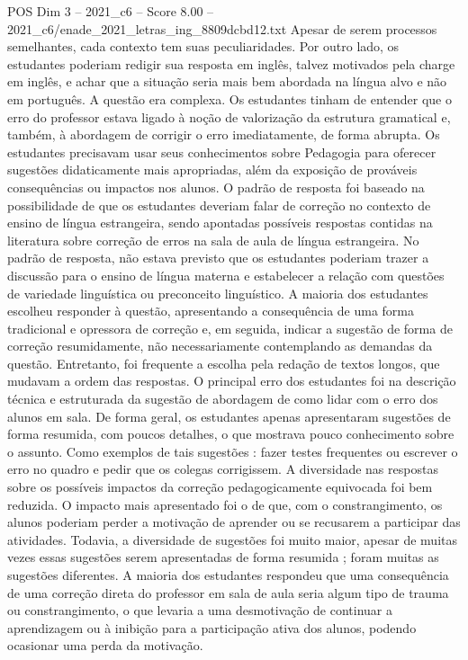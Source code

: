 \begin{textsample}{POS Dim 3 – 2021\_c6 – Score 8.00 – 2021\_c6/enade\_2021\_letras\_ing\_8809dcbd12.txt}
Apesar de serem processos semelhantes, cada contexto tem suas peculiaridades.
Por outro lado, os estudantes poderiam redigir sua resposta em inglês, talvez motivados pela charge em inglês, e achar que a situação seria mais bem abordada na língua alvo e não em português.
A questão era complexa.
Os estudantes tinham de entender que o erro do professor estava ligado à noção de valorização da estrutura gramatical e, também, à abordagem de corrigir o erro imediatamente, de forma abrupta.
Os estudantes precisavam usar seus conhecimentos sobre Pedagogia para oferecer sugestões didaticamente mais apropriadas, além da exposição de prováveis consequências ou impactos nos alunos.
O padrão de resposta foi baseado na possibilidade de que os estudantes deveriam falar de correção no contexto de ensino de língua estrangeira, sendo apontadas possíveis respostas contidas na literatura sobre correção de erros na sala de aula de língua estrangeira.
No padrão de resposta, não estava previsto que os estudantes poderiam trazer a discussão para o ensino de língua materna e estabelecer a relação com questões de variedade linguística ou preconceito linguístico.
A maioria dos estudantes escolheu responder à questão, apresentando a consequência de uma forma tradicional e opressora de correção e, em seguida, indicar a sugestão de forma de correção resumidamente, não necessariamente contemplando as demandas da questão.
Entretanto, foi frequente a escolha pela redação de textos longos, que mudavam a ordem das respostas.
O principal erro dos estudantes foi na descrição técnica e estruturada da sugestão de abordagem de como lidar com o erro dos alunos em sala.
De forma geral, os estudantes apenas apresentaram sugestões de forma resumida, com poucos detalhes, o que mostrava pouco conhecimento sobre o assunto.
Como exemplos de tais sugestões : fazer testes frequentes ou escrever o erro no quadro e pedir que os colegas corrigissem.
A diversidade nas respostas sobre os possíveis impactos da correção pedagogicamente equivocada foi bem reduzida.
O impacto mais apresentado foi o de que, com o constrangimento, os alunos poderiam perder a motivação de aprender ou se recusarem a participar das atividades.
Todavia, a diversidade de sugestões foi muito maior, apesar de muitas vezes essas sugestões serem apresentadas de forma resumida ; foram muitas as sugestões diferentes.
A maioria dos estudantes respondeu que uma consequência de uma correção direta do professor em sala de aula seria algum tipo de trauma ou constrangimento, o que levaria a uma desmotivação de continuar a aprendizagem ou à inibição para a participação ativa dos alunos, podendo ocasionar uma perda da motivação.

\end{textsample}
